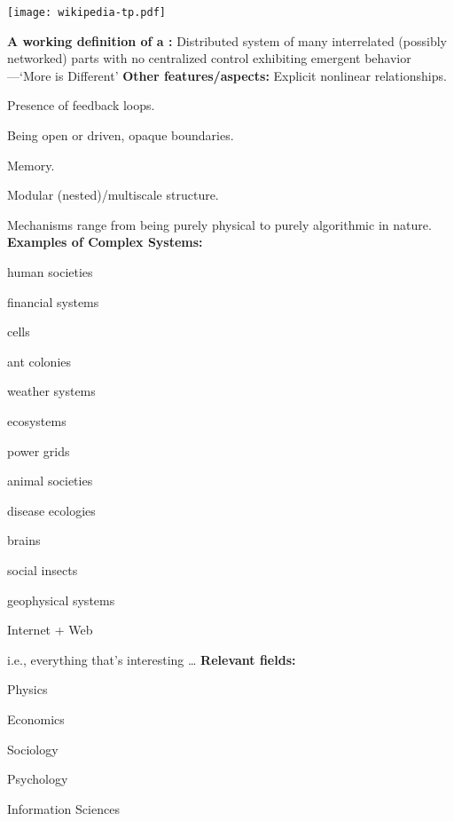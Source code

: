 \begin{marginfigure}[]
\texttt{[image: wikipedia-tp.pdf]}
\end{marginfigure}


  \textbf{A working definition of a :}
      Distributed system of many interrelated (possibly networked) parts
      with no centralized control
      exhibiting 
      emergent behavior---`More is Different'\cite{anderson1972a}
  \textbf{Other features/aspects:}
      Explicit nonlinear relationships.
    
      Presence of feedback loops.
    
      Being open or driven, opaque boundaries.
    
      Memory.
    
      Modular (nested)/multiscale structure.
    
      Mechanisms range from being purely physical to purely algorithmic in nature.
  \textbf{Examples of Complex Systems:}
    
        
          human societies 
        
          financial systems
        
          cells     
        
          ant colonies 
        
          weather systems 
        
          ecosystems     
        
          power grids
      
          animal societies     
        
          disease ecologies    
        
          brains               
        
          social insects       
        
          geophysical systems  
        
          Internet + Web
    
  
  
    i.e., everything that's interesting \ldots
  \textbf{Relevant fields:}
    
       
        Physics
       
        Economics
       
        Sociology
       
        Psychology
       
        Information Sciences
      
